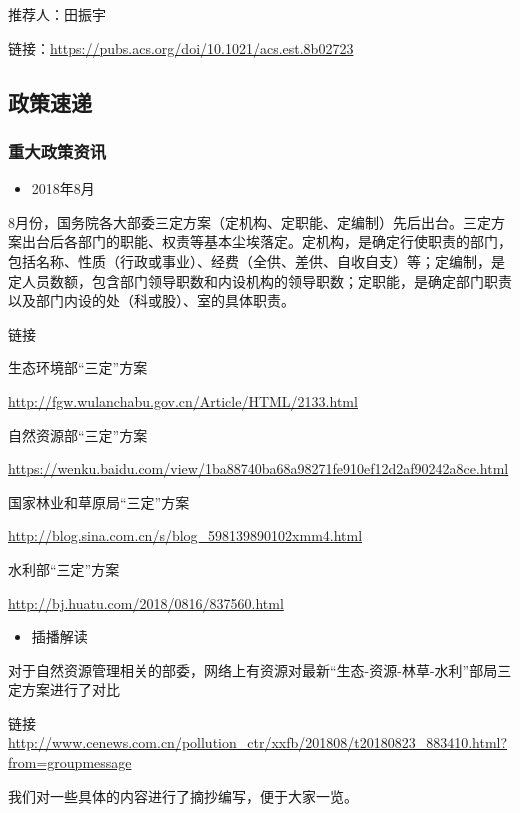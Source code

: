 \documentclass[]{book}
\providecommand{\tightlist}{%
  \setlength{\itemsep}{0pt}\setlength{\parskip}{0pt}}
\begin{document}
推荐人：田振宇

链接：\url{https://pubs.acs.org/doi/10.1021/acs.est.8b02723}

\subsection*{政策速递}\label{-4}

\subsubsection*{重大政策资讯}\label{-4}

\begin{itemize}
\tightlist
\item
  2018年8月
\end{itemize}

8月份，国务院各大部委三定方案（定机构、定职能、定编制）先后出台。三定方案出台后各部门的职能、权责等基本尘埃落定。定机构，是确定行使职责的部门，包括名称、性质（行政或事业）、经费（全供、差供、自收自支）等；定编制，是定人员数额，包含部门领导职数和内设机构的领导职数；定职能，是确定部门职责以及部门内设的处（科或股）、室的具体职责。

链接

生态环境部``三定''方案

\url{http://fgw.wulanchabu.gov.cn/Article/HTML/2133.html}

自然资源部``三定''方案

\url{https://wenku.baidu.com/view/1ba88740ba68a98271fe910ef12d2af90242a8ce.html}

国家林业和草原局``三定''方案

\url{http://blog.sina.com.cn/s/blog_598139890102xmm4.html}

水利部``三定''方案

\url{http://bj.huatu.com/2018/0816/837560.html}

\begin{itemize}
\tightlist
\item
  插播解读
\end{itemize}

对于自然资源管理相关的部委，网络上有资源对最新``生态-资源-林草-水利''部局三定方案进行了对比

链接
\url{http://www.cenews.com.cn/pollution_ctr/xxfb/201808/t20180823_883410.html?from=groupmessage}

我们对一些具体的内容进行了摘抄编写，便于大家一览。
\end{document}
